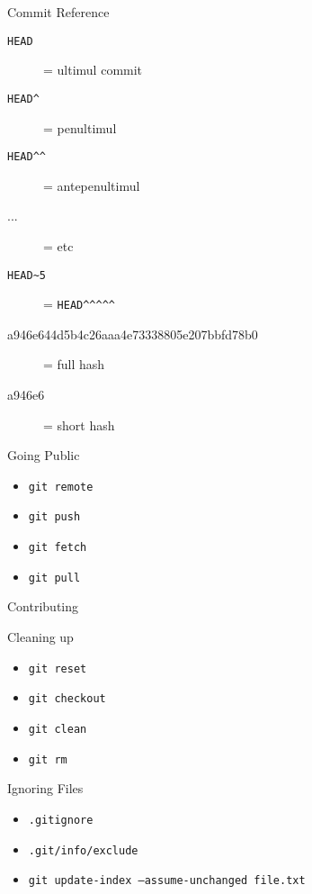 \documentclass{beamer}
\begin{document}
\begin{frame}{Commit Reference}
  \begin{description}
    \item[\texttt{HEAD}] = ultimul commit
    \item[\texttt{HEAD\textasciicircum}] = penultimul
    \item[\texttt{HEAD\textasciicircum\textasciicircum}] = antepenultimul
    \item[...] = etc
    \pause
    \item[\texttt{HEAD\textasciitilde5}] = \texttt{HEAD\textasciicircum\textasciicircum\textasciicircum\textasciicircum\textasciicircum}
    \pause
    \item[a946e644d5b4c26aaa4e73338805e207bbfd78b0] = full hash
    \item[a946e6] = short hash
  \end{description}
\end{frame}

\begin{frame}{Going Public}
  \begin{itemize}
    \item \texttt{git remote}
    \item \texttt{git push}
    \item \texttt{git fetch}
    \item \texttt{git pull}
  \end{itemize}
\end{frame}

\begin{frame}{Contributing}
\end{frame}

\begin{frame}{Cleaning up}
  \begin{itemize}
    \item \texttt{git reset}
    \item \texttt{git checkout}
    \item \texttt{git clean}
    \item \texttt{git rm}
  \end{itemize}
\end{frame}

\begin{frame}{Ignoring Files}
  \begin{itemize}
    \item \texttt{.gitignore}
    \item \texttt{.git/info/exclude}
    \item \texttt{git update-index --assume-unchanged file.txt}
  \end{itemize}
\end{frame}
\end{document}
